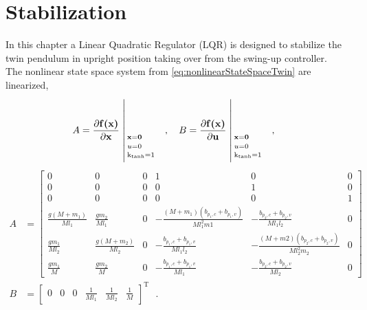 \chapter{Stabilization}
%
%
In this chapter a Linear Quadratic Regulator (LQR) is designed to stabilize the twin pendulum in upright position taking over from the swing-up controller.\\
The nonlinear state space system from \autoref{eq:nonlinearStateSpaceTwin} are linearized,
\begin{align}
  A &= \frac{\partial \vec{f(x)}}{\partial \vec{x}} \whereThree{\vec{x}=\vec{0}\ \ \ \ }{u=0\ \ \ \ }{\text{k}_\text{tanh}=1} \ \ \ , \ \ \
  B = \frac{\partial \vec{f(x)}}{\partial \vec{u}}  \whereThree{\vec{x}=\vec{0}\ \ \ \ }{u=0\ \ \ \ }{\text{k}_\text{tanh}=1} \ \ \ ,
  \label{eq:linearTwin_AB}
\end{align}
\begin{align}
  A &= 
  \begin{bmatrix}
    0                         & 0                         & 0 & 1                                                    & 0                                                    & 0 \\
    0                         & 0                         & 0 & 0                                                    & 1                                                    & 0 \\
    0                         & 0                         & 0 & 0                                                    & 0                                                    & 1 \\
    \frac{g (M + m_1)}{M l_1} & \frac{g m_2}{M l_1}       & 0 & -\frac{(M + m_1)(b_{p_1,c} + b_{p_1,v})}{M l_1^2 m1} & -\frac{b_{p_2,c} + b_{p_2,v}}{M l_1 l_2}             & 0 \\
    \frac{g m_1}{M l_2}       & \frac{g (M + m_2)}{M l_2} & 0 & -\frac{b_{p_1,c} + b_{p_1,v}}{M l_1 l_2}             & -\frac{(M + m2)(b_{p_2,c} + b_{p_2,v})}{M l_2^2 m_2} & 0 \\
    \frac{g m_1}{M}           & \frac{g m_2}{M}           & 0 & -\frac{b_{p_1,c} + b_{p_1,v}}{M l_1}                 & -\frac{b_{p_2,c} + b_{p_2,v}}{M l_2}                 & 0
  \end{bmatrix}  \label{eq:linearTwin_A} \\
  B &= 
  \begin{bmatrix}
    0  &  0  &  0  &  \frac{1}{M l_1} & \frac{1}{M l_2} & \frac{1}{M}
  \end{bmatrix}^{\mathrm{T}}   \ \ \ .
  \label{eq:linearTwin_B}
\end{align}
